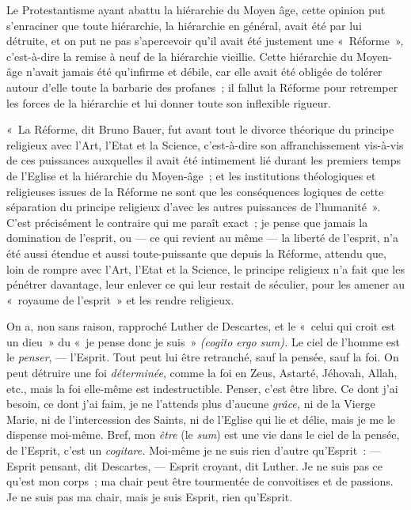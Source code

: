 \documentclass[french,twoside]{book} %
\begin{document}
Le Protestantisme ayant abattu la hiérarchie du Moyen âge, cette opinion put s’enraciner que toute hiérarchie, la hiérarchie en général, avait été par lui détruite, et on put ne pas s’apercevoir qu’il avait été justement une « Réforme », c’est-à-dire la remise à neuf de la hiérarchie vieillie. Cette hiérarchie du Moyen-âge n’avait jamais été qu’infirme et débile, car elle avait été obligée de tolérer autour d’elle toute la barbarie des profanes ; il fallut la Réforme pour retremper les forces de la hiérarchie et lui donner toute son inflexible rigueur.\par
« La Réforme, dit Bruno Bauer, fut avant tout le divorce théorique du principe religieux avec l’Art, l’Etat et la Science, c’est-à-dire son affranchissement vis-à-vis de ces puissances auxquelles il avait  été intimement lié durant les premiers temps de l’Eglise et la hiérarchie du Moyen-âge ; et les institutions théologiques et religieuses issues de la Réforme ne sont que les conséquences logiques de cette séparation du principe religieux d’avec les autres puissances de l’humanité ». C’est précisément le contraire qui me paraît exact ; je pense que jamais la domination de l’esprit, ou — ce qui revient au même — la liberté de l’esprit, n’a été aussi étendue et aussi toute-puissante que depuis la Réforme, attendu que, loin de rompre avec l’Art, l’Etat et la Science, le principe religieux n’a fait que les pénétrer davantage, leur enlever ce qui leur restait de séculier, pour les amener au « royaume de l’esprit » et les rendre religieux.\par
On a, non sans raison, rapproché Luther de Descartes, et le « celui qui croit est un dieu » du « je pense donc je suis » \emph{(cogito ergo sum).} Le ciel de l’homme est le \emph{penser}, — l’Esprit. Tout peut lui être retranché, sauf la pensée, sauf la foi. On peut détruire une foi \emph{déterminée}, comme la foi en Zeus, Astarté, Jéhovah, Allah, etc., mais la foi elle-même est indestructible. Penser, c’est être libre. Ce dont j’ai besoin, ce dont j’ai faim, je ne l’attends plus d’aucune \emph{grâce,} ni de la Vierge Marie, ni de l’intercession des Saints, ni de l’Eglise qui lie et délie, mais je me le dispense moi-même. Bref, mon \emph{être} (le \emph{sum}) est une vie dans le ciel de la pensée, de l’Esprit, c’est un \emph{cogitare.} Moi-même je ne suis rien d’autre qu’Esprit : — Esprit pensant, dit Descartes, — Esprit croyant, dit Luther. Je ne suis pas ce qu’est mon corps ; ma chair peut être tourmentée de convoitises et de passions. Je ne suis pas ma chair, mais je suis Esprit, rien qu’Esprit.\par
\end{document}
